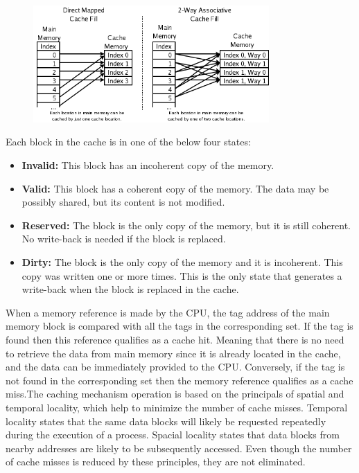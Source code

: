 \documentclass[twocolumn]{IEEEtran}
\begin{document}
\begin{figure}[H]
  \centering
  \includegraphics[width=90mm]{cache}
\end{figure}

Each block in the cache is in one of the below four states:

\begin {itemize}
\item \textbf {Invalid:} This block has an incoherent copy of the memory.
\item \textbf{Valid:} This block has a coherent copy of the memory. The data may be possibly shared, but its content is not modified.
\item \textbf{Reserved:} The block is the only copy of the memory, but it is still coherent. No write-back is needed if the block is replaced.
\item \textbf {Dirty:} The block is the only copy of the memory and it is incoherent. This copy was written one or more times. This is the only state that generates a write-back when the block is replaced in the cache.

\end{itemize}

When a memory reference is made by the CPU, the tag address of the main memory block is compared with all the tags in the corresponding set. If the tag is found then this reference qualifies as a cache hit. Meaning that there is no need to retrieve the data from main memory since it is already located in the cache, and the data can be immediately provided to the CPU. Conversely, if the tag is not found in the corresponding set then the memory reference qualifies as a cache miss.The caching mechanism operation is based on the principals of spatial and temporal locality, which help to minimize the number of
cache misses. Temporal locality states that the same data blocks will likely be requested repeatedly during the execution of a process. Spacial locality states that data blocks from nearby addresses are likely to be subsequently accessed. Even though the number of cache misses is reduced by these principles, they are not eliminated.
\end{document}
